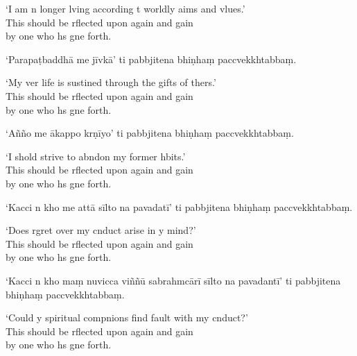 \begin{english}
`I am n longer lving according t worldly aims and vlues.'\\
This should be rflected upon again and gain\\
by one who hs gne forth.
\end{english}

`Parapaṭbaddhā me jīvkā' ti pabbjitena bhiṇhaṃ
paccvekkhtabbaṃ.

\begin{english}
`My ver life is sustined through the gifts of thers.'\\
This should be rflected upon again and gain\\
by one who hs gne forth.
\end{english}

`Añño me ākappo krṇīyo' ti pabbjitena bhiṇhaṃ
paccvekkhtabbaṃ.

\begin{english}
`I shold strive to abndon my former hbits.'\\
This should be rflected upon again and gain\\
by one who hs gne forth.
\end{english}

`Kacci n kho me attā sīlto na pavadatī' ti
pabbjitena bhiṇhaṃ paccvekkhtabbaṃ.

\begin{english}
`Does rgret over my cnduct arise in y mind?'\\
This should be rflected upon again and gain\\
by one who hs gne forth.
\end{english}

`Kacci n kho maṃ nuvicca viññū sabrahmcārī sīlto
na pavadantī' ti pabbjitena bhiṇhaṃ
paccvekkhtabbaṃ.

\begin{english}
`Could y spiritual compnions find fault with my cnduct?'\\
This should be rflected upon again and gain\\
by one who hs gne forth.
\end{english}

